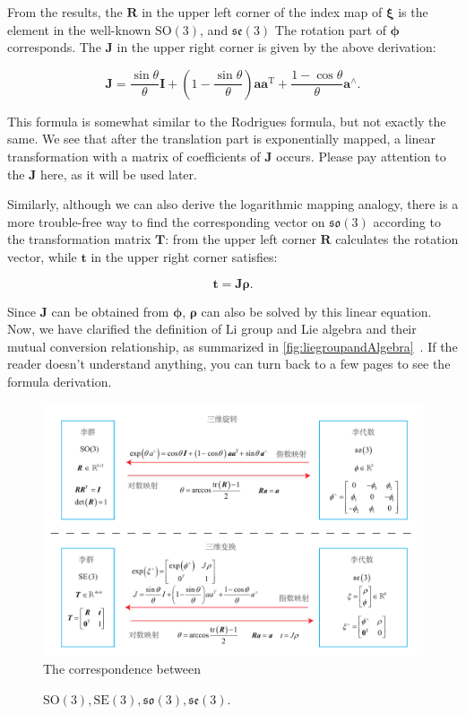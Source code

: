 From the results, the $\bm{R}$ in the upper left corner of the index map of $\boldsymbol{\xi}$ is the element in the well-known $\mathrm{SO}(3)$, and $\mathfrak{se }(3)$ The rotation part of $\boldsymbol{\phi}$ corresponds. The $\bm{J}$ in the upper right corner is given by the above derivation:

\begin{equation}
\label{eq:lieAlgebraJacobian}
\bm{J} = \frac{{\sin \theta }}{\theta } \bm{I} + \left( {1 - \frac{{\sin \theta }}{\theta }} \right) \bm{a} { \bm{a}^\mathrm{T}} + \frac{{1 - \cos \theta }}{\theta }{ \bm{a}^ \wedge }.
\end{equation}

This formula is somewhat similar to the Rodrigues formula, but not exactly the same. We see that after the translation part is exponentially mapped, a linear transformation with a matrix of coefficients of $\bm{J}$ occurs. Please pay attention to the $\bm{J}$ here, as it will be used later.

Similarly, although we can also derive the logarithmic mapping analogy, there is a more trouble-free way to find the corresponding vector on $\mathfrak{so}(3)$ according to the transformation matrix $\bm{T}$: from the upper left corner $\bm{R}$ calculates the rotation vector, while $\bm{t}$ in the upper right corner satisfies:

\begin{equation}
	\bm{t} = \bm{J} \boldsymbol{\rho}.
\end{equation}

Since $\bm{J}$ can be obtained from $\boldsymbol{\phi}$, $\boldsymbol{\rho}$ can also be solved by this linear equation. Now, we have clarified the definition of Li group and Lie algebra and their mutual conversion relationship, as summarized in \autoref{fig:liegroupandAlgebra}~. If the reader doesn't understand anything, you can turn back to a few pages to see the formula derivation.

\begin{figure}[!ht]
	\centering
	\includegraphics[width=1.0\textwidth]{chapter05/lieGroup/liegroupandAlgebra.pdf}
	The correspondence between \caption{$\mathrm{SO}(3), \mathrm{SE}(3), \mathfrak{so}(3), \mathfrak{se}(3)$. }
	\label{fig:liegroupandAlgebra}
\end{figure}

\clearpage